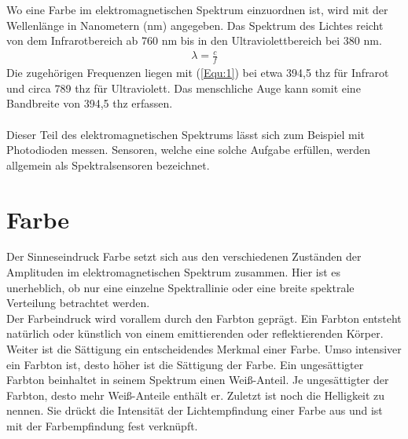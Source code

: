 \documentclass[11pt]{scrartcl}
\begin{document}
Wo eine Farbe im elektromagnetischen Spektrum einzuordnen ist, wird mit der Wellenlänge in Nanometern (nm) angegeben. Das Spektrum des Lichtes reicht von
dem Infrarotbereich ab 760 nm bis in den Ultraviolettbereich bei 380 nm.
\begin{align}\label{Equ:1}
    \lambda = \frac{c}{f}
\end{align}
Die zugehörigen Frequenzen liegen mit (\ref{Equ:1}) bei etwa 394,5 \ac{thz} für Infrarot und circa 789 \ac{thz} für Ultraviolett. Das menschliche Auge kann somit 
eine Bandbreite von 394,5 \ac{thz} erfassen.\\
\\
Dieser Teil des elektromagnetischen Spektrums lässt sich zum Beispiel mit Photodioden messen. Sensoren, welche eine solche Aufgabe erfüllen,
werden allgemein als Spektralsensoren bezeichnet.
\clearpage

\section{Farbe}
Der Sinneseindruck Farbe setzt sich aus den verschiedenen Zuständen der Amplituden im elektromagnetischen Spektrum zusammen. Hier ist es
unerheblich, ob nur eine einzelne Spektrallinie oder eine breite spektrale Verteilung betrachtet werden.\\
Der Farbeindruck wird vorallem durch den Farbton geprägt. Ein Farbton entsteht natürlich oder künstlich von einem emittierenden oder reflektierenden Körper.
Weiter ist die Sättigung ein entscheidendes Merkmal einer Farbe. Umso intensiver ein Farbton ist, desto höher ist die Sättigung der Farbe. Ein ungesättigter
Farbton beinhaltet in seinem Spektrum einen Weiß-Anteil. Je ungesättigter der Farbton, desto mehr Weiß-Anteile enthält er. Zuletzt ist noch die Helligkeit zu
nennen. Sie drückt die Intensität der Lichtempfindung einer Farbe aus und ist mit der Farbempfindung fest verknüpft.
\end{document}
